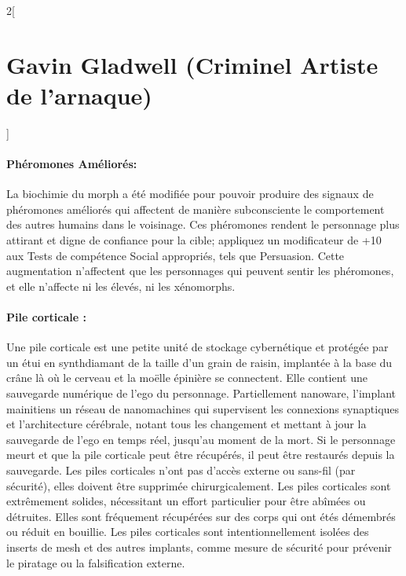 \documentclass[a4paper,9pt]{article}
\begin{document}
\begin{multicols}{2}[\section*{Gavin Gladwell (Criminel Artiste de l'arnaque)}]
\paragraph{Phéromones Améliorés: }La biochimie du morph a été modifiée pour
pouvoir produire des signaux de phéromones améliorés qui affectent de manière
subconsciente le comportement des autres humains dans le voisinage. Ces
phéromones rendent le personnage plus attirant et digne de confiance pour la
cible; appliquez un modificateur de +10 aux Tests de compétence Social
appropriés, tels que Persuasion. Cette augmentation n'affectent que les
personnages qui peuvent sentir les phéromones, et elle n'affecte ni les élevés,
ni les xénomorphs.

\paragraph{Pile corticale :}
Une pile corticale est une petite unité de stockage cybernétique et protégée
par un étui en synthdiamant de la taille d'un grain de raisin, implantée à la
base du crâne là où le cerveau et la moëlle épinière se connectent. Elle
contient une sauvegarde numérique de l'ego du personnage. Partiellement
nanoware, l'implant mainitiens un réseau de nanomachines qui supervisent
les connexions synaptiques et l'architecture cérébrale, notant tous les
changement et mettant à jour la sauvegarde de l'ego en temps réel, jusqu'au
moment de la mort. Si le personnage meurt et que la pile corticale peut être
récupérés, il peut être restaurés depuis la sauvegarde. Les piles corticales
n'ont pas d'accès externe ou sans-fil (par sécurité), elles doivent être
supprimée chirurgicalement. Les piles corticales sont extrêmement solides,
nécessitant un effort particulier pour être abîmées ou détruites. Elles sont
fréquement récupérées sur des corps qui ont étés démembrés ou réduit en
bouillie. Les piles corticales sont intentionnellement isolées des inserts de
mesh et des autres implants, comme mesure de sécurité pour prévenir le piratage
ou la falsification externe.

\end{multicols}

\newpage
\end{document}
